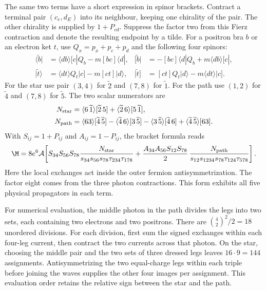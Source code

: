 The same two terms have a short expression in spinor brackets. Contract
a terminal pair $(c_e,d_E)$ into its neighbour, keeping one chirality
of the pair. The other chirality is supplied by $1+P_{cd}$. Suppress the
factor two from this Fierz contraction and denote the resulting endpoint
by a tilde. For a positron bra $b$ or an electron ket $t$, use
$Q_x=p_x+p_c+p_d$ and the following four spinors:
\begin{align}
 \langle\widetilde b|&=\langle d b\rangle[c|Q_b-m[b c]\langle d|,&
 [\widetilde b|&=-[b c]\langle d|Q_b+m\langle d b\rangle[c|,\nonumber\\
 |\widetilde t\rangle&=\langle d t\rangle Q_t|c]-m[c t]|d\rangle,&
 |\widetilde t]&=[c t]Q_t|d\rangle-m\langle d t\rangle|c].
 \label{eq:eight-dressed-leaf}
\end{align}
For the star use pair $(3,4)$ for $\widetilde2$ and $(7,8)$ for
$\widetilde1$. For the path use $(1,2)$ for $\widetilde4$ and $(7,8)$
for $\widetilde5$. The two scalar numerators are
\begin{align}
 N_{\rm star}&=\langle6\,\widetilde1\rangle[\widetilde2\,5]
                 +\langle\widetilde2\,6\rangle[5\,\widetilde1],\nonumber\\
 N_{\rm path}&=\langle63\rangle[\widetilde4\,\widetilde5]
           -\langle\widetilde4\,6\rangle[3\,\widetilde5]
           -\langle3\,\widetilde5\rangle[\widetilde4\,6]
           +\langle\widetilde4\,\widetilde5\rangle[63].
 \label{eq:eight-star-path-numerators}
\end{align}
With $S_{ij}=1+P_{ij}$ and $A_{ij}=1-P_{ij}$, the bracket formula reads
\begin{align}
 \M=8e^6\mathcal A\!\left[
 S_{34}S_{56}S_{78}\frac{N_{\rm star}}{s_{34}s_{56}s_{78}\tau_{234}\tau_{178}}
 +\frac{A_{34}A_{56}S_{12}S_{78}}2\,
 \frac{N_{\rm path}}{s_{12}s_{1234}s_{78}\tau_{124}\tau_{578}}\right].
 \label{eq:eight-eight-weyl}
\end{align}
Here the local exchanges act inside the outer fermion antisymmetrization.
The factor eight comes from the three photon contractions. This form
exhibits all five physical propagators in each term.

For numerical evaluation, the middle photon in the path divides the legs
into two sets, each containing two electrons and two positrons. There are
$\binom42^2/2=18$ unordered divisions. For each division, first sum the
signed exchanges within each four-leg current, then contract the two
currents across that photon. On the star, choosing the middle pair and
the two sets of three dressed legs leaves $16\cdot9=144$ assignments.
Antisymmetrizing the two equal-charge legs within each triple before
joining the waves supplies the other four images per assignment. This
evaluation order retains the relative sign between the star and the path.


